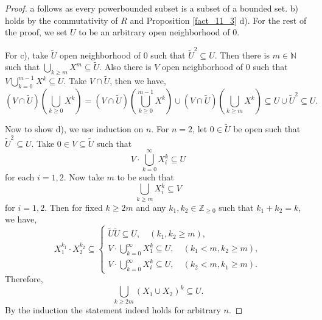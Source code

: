 \documentclass[10pt]{article}
\numberwithin{equation}{section}
\theoremstyle{definition}
\begin{document}
\begin{proof}
    a follows as every powerbounded subset is a subset of a bounded set. b) holds by the commutativity of $R$ and Proposition \ref{fact_11_3} d). For the rest of the proof, we set $U$ to be an arbitrary open neighborhood of $0$.
    \par For c), take $\tilde{U}$ open neighborhood of $0$ such that $\tilde{U}^2\subseteq U$. Then there is $m\in\mathbb{N}$ such that $\bigcup_{k\geq m}X^m\subseteq \tilde{U}$. Also there is $V$ open neighborhood of $0$ such that $V\bigcup_{k=0}^{m-1}X^k\subseteq U$. Take $V\cap\tilde{U}$, then we have,
    \begin{equation*}
        (V\cap \tilde{U})\left(\bigcup_{k\geq0}X^k\right) = (V\cap\tilde{U})\left(\bigcup_{k\geq0}^{m-1}X^k\right)\cup(V\cap \tilde{U})\left(\bigcup_{k\geq m} X^k\right) \subseteq U\cup \tilde{U}^2\subseteq U.
    \end{equation*}
    \par Now to show d), we use induction on $n$. For $n=2$, let $0\in\tilde{U}$ be open such that $\tilde{U}^2\subseteq U$. Take $0\in V\subseteq\tilde{U}$ such that
    \begin{equation*}
        V\cdot\bigcup_{k=0}^\infty X_i^k\subseteq U
    \end{equation*}
    for each $i=1,2$. Now take $m$ to be such that
    \begin{equation*}
        \bigcup_{k\geq m}X_i^k\subseteq V
    \end{equation*}
    for $i=1,2$. Then for fixed $k\geq 2m$ and any $k_1,k_2\in\mathbb{Z}_{\geq0}$ such that $k_1+k_2 = k$, we have,
    \begin{equation*}
        X_1^{k_1}\cdot X_2^{k_2} \subseteq \begin{cases}
            \tilde{U}\tilde{U}\subseteq U,\quad(k_1,k_2\geq m),\\
            V\cdot\bigcup_{k=0}^\infty X_1^k\subseteq U,\quad(k_1<m,k_2\geq m),\\
            V\cdot\bigcup_{k=0}^\infty X_i^k\subseteq U,\quad(k_2<m,k_1\geq m).
        \end{cases}
    \end{equation*}
    Therefore,
    \begin{equation*}
        \bigcup_{k\geq 2m}(X_1\cup X_2)^k \subseteq U.
    \end{equation*}
    By the induction the statement indeed holds for arbitrary $n$.

\end{proof}
\end{document}

